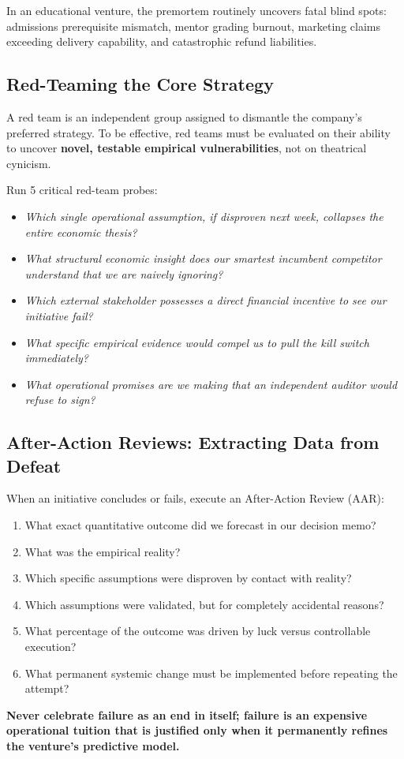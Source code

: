 In an educational venture, the premortem routinely uncovers fatal blind spots: admissions prerequisite mismatch, mentor grading burnout, marketing claims exceeding delivery capability, and catastrophic refund liabilities.

\subsection{Red-Teaming the Core Strategy}

A red team is an independent group assigned to dismantle the company's preferred strategy. To be effective, red teams must be evaluated on their ability to uncover \textbf{novel, testable empirical vulnerabilities}, not on theatrical cynicism.

Run 5 critical red-team probes:
\begin{itemize}[leftmargin=10pt,itemsep=1pt,topsep=1pt]
  \item \textit{Which single operational assumption, if disproven next week, collapses the entire economic thesis?}
  \item \textit{What structural economic insight does our smartest incumbent competitor understand that we are naively ignoring?}
  \item \textit{Which external stakeholder possesses a direct financial incentive to see our initiative fail?}
  \item \textit{What specific empirical evidence would compel us to pull the kill switch immediately?}
  \item \textit{What operational promises are we making that an independent auditor would refuse to sign?}
\end{itemize}

\subsection{After-Action Reviews: Extracting Data from Defeat}

When an initiative concludes or fails, execute an After-Action Review (AAR):
\begin{enumerate}[leftmargin=12pt,itemsep=1pt,topsep=1pt,parsep=0pt]
  \item What exact quantitative outcome did we forecast in our decision memo?
  \item What was the empirical reality?
  \item Which specific assumptions were disproven by contact with reality?
  \item Which assumptions were validated, but for completely accidental reasons?
  \item What percentage of the outcome was driven by luck versus controllable execution?
  \item What permanent systemic change must be implemented before repeating the attempt?
\end{enumerate}

\textbf{Never celebrate failure as an end in itself; failure is an expensive operational tuition that is justified only when it permanently refines the venture's predictive model.}
